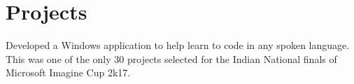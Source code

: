 \documentclass[a4paper]{deedy-resume} %
\begin{document}
\begin{minipage}[t]{0.66\textwidth}

\section{Projects}


Developed a Windows application to help learn to code in any spoken language. \\
This was one of the only 30 projects selected for the Indian National finals of Microsoft Imagine Cup 2k17.

\sectionspace








%
%
%



\end{minipage}
\end{document}
